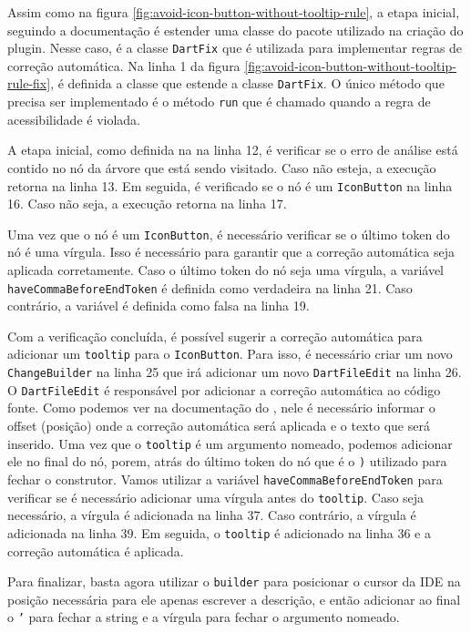 Assim como na figura \ref{fig:avoid-icon-button-without-tooltip-rule}, a etapa inicial, seguindo a documentação \cite{customlintbuilder} é estender uma classe do pacote utilizado na criação do plugin. Nesse caso, é a classe \texttt{DartFix} que é utilizada para implementar regras de correção automática. Na linha 1 da figura \ref{fig:avoid-icon-button-without-tooltip-rule-fix}, é definida a classe  que estende a classe \texttt{DartFix}. O único método que precisa ser implementado é o método \texttt{run} que é chamado quando a regra de acessibilidade é violada.

A etapa inicial, como definida na na linha 12, é verificar se o erro de análise está contido no nó da árvore que está sendo visitado. Caso não esteja, a execução retorna na linha 13. Em seguida, é verificado se o nó é um \texttt{IconButton} na linha 16. Caso não seja, a execução retorna na linha 17.

Uma vez que o nó é um \texttt{IconButton}, é necessário verificar se o último token do nó é uma vírgula. Isso é necessário para garantir que a correção automática seja aplicada corretamente. Caso o último token do nó seja uma vírgula, a variável \texttt{haveCommaBeforeEndToken} é definida como verdadeira na linha 21. Caso contrário, a variável é definida como falsa na linha 19.

Com a verificação concluída, é possível sugerir a correção automática para adicionar um \texttt{tooltip} para o \texttt{IconButton}. Para isso, é necessário criar um novo \texttt{ChangeBuilder} na linha 25 que irá adicionar um novo \texttt{DartFileEdit} na linha 26. O \texttt{DartFileEdit} é responsável por adicionar a correção automática ao código fonte. Como podemos ver na documentação do \cite{customlintbuilder}, nele é necessário informar o offset (posição) onde a correção automática será aplicada e o texto que será inserido. Uma vez que o \texttt{tooltip} é um argumento nomeado, podemos adicionar ele no final do nó, porem, atrás do último token do nó que é o \texttt{)} utilizado para fechar o construtor. Vamos utilizar a variável \texttt{haveCommaBeforeEndToken} para verificar se é necessário adicionar uma vírgula antes do \texttt{tooltip}. Caso seja necessário, a vírgula é adicionada na linha 37. Caso contrário, a vírgula é adicionada na linha 39. Em seguida, o \texttt{tooltip} é adicionado na linha 36 e a correção automática é aplicada.

Para finalizar, basta agora utilizar o \texttt{builder} para posicionar o cursor da IDE na posição necessária para ele apenas escrever a descrição, e então adicionar ao final o \texttt{'} para fechar a string e a vírgula para fechar o argumento nomeado.

